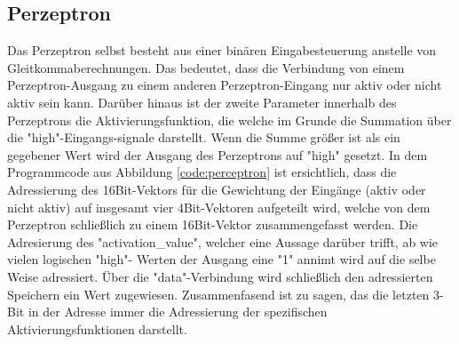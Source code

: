 \documentclass{article}
\numberwithin{equation}{section}
\begin{document}
\subsection{Perzeptron}
Das Perzeptron selbst besteht aus einer binären Eingabesteuerung anstelle von 
Gleitkommaberechnungen. Das bedeutet, dass die Verbindung von einem Perzeptron-Ausgang zu 
einem anderen Perzeptron-Eingang nur aktiv oder nicht aktiv sein kann.
Darüber hinaus ist der zweite Parameter innerhalb des Perzeptrons die Aktivierungsfunktion, die
welche im Grunde die Summation über die "high"-Eingangs-signale darstellt.
Wenn die Summe größer ist als ein gegebener Wert wird der Ausgang des Perzeptrons auf 
"high" gesetzt. In dem Programmcode aus Abbildung \ref{code:perceptron} ist ersichtlich, 
dass die Adressierung des 16Bit-Vektors für die Gewichtung der Eingänge (aktiv oder nicht 
aktiv) auf insgesamt vier 4Bit-Vektoren aufgeteilt wird, welche von dem Perzeptron 
schließlich zu einem 16Bit-Vektor zusammengefasst werden. Die Adresierung des 
"activation\_value", welcher eine Aussage darüber trifft, ab wie vielen logischen "high"-
Werten der Ausgang eine "1" annimt wird auf die selbe Weise adressiert. Über die 
"data"-Verbindung wird schließlich den adressierten Speichern ein Wert zugewiesen.
Zusammenfasend ist zu sagen, das die letzten 3-Bit in der Adresse immer die Adressierung 
der spezifischen Aktivierungsfunktionen darstellt.
\end{document}
